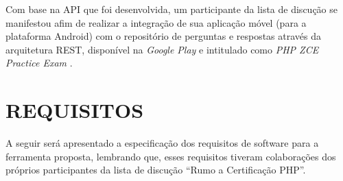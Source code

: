Com base na \acs{API} que foi desenvolvida, um participante da lista de discução
se manifestou afim de realizar a integração de sua aplicação móvel (para a plataforma
Android) com o repositório de perguntas e respostas através da arquitetura
\ac{REST}, disponível na \textit{Google Play} e intitulado como \textit{PHP ZCE
Practice Exam} \cite{googlePlayPHPZCEPracticeExam}.

\section{REQUISITOS}

A seguir será apresentado a especificação dos requisitos de software para a
ferramenta proposta, lembrando que, esses requisitos tiveram colaborações dos
próprios participantes da lista de discução ``Rumo a Certificação PHP''.


